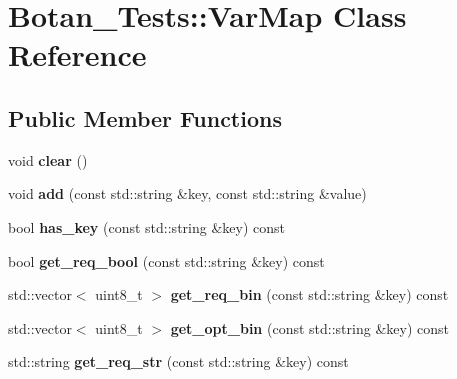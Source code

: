 \hypertarget{class_botan___tests_1_1_var_map}{}\section{Botan\+\_\+\+Tests\+:\+:Var\+Map Class Reference}
\label{class_botan___tests_1_1_var_map}
\subsection*{Public Member Functions}
\begin{DoxyCompactItemize}
\item 
\mbox{\label{class_botan___tests_1_1_var_map_a02e6ad6dd1c8d530d3101266b6df5931}} 
void {\bfseries clear} ()
\item 
\mbox{\label{class_botan___tests_1_1_var_map_af0d058ca1073bbe5e685713573c9c88c}} 
void {\bfseries add} (const std\+::string \&key, const std\+::string \&value)
\item 
\mbox{\label{class_botan___tests_1_1_var_map_a7d8ee7426fb87259fc9bbb0f4fe5bc73}} 
bool {\bfseries has\+\_\+key} (const std\+::string \&key) const
\item 
\mbox{\label{class_botan___tests_1_1_var_map_a48619eb48b3aee5a1baa9413823fac6f}} 
bool {\bfseries get\+\_\+req\+\_\+bool} (const std\+::string \&key) const
\item 
\mbox{\label{class_botan___tests_1_1_var_map_a655e561d62f69621cb0bdc019c3ec494}} 
std\+::vector$<$ uint8\+\_\+t $>$ {\bfseries get\+\_\+req\+\_\+bin} (const std\+::string \&key) const
\item 
\mbox{\label{class_botan___tests_1_1_var_map_a54a33182b761862fede10de90ff0a1dc}} 
std\+::vector$<$ uint8\+\_\+t $>$ {\bfseries get\+\_\+opt\+\_\+bin} (const std\+::string \&key) const
\item 
\mbox{\label{class_botan___tests_1_1_var_map_a5a6fd97e93d4df46c6c8cc0ac0ac5d3a}} 
std\+::string {\bfseries get\+\_\+req\+\_\+str} (const std\+::string \&key) const

\end{DoxyCompactItemize}
